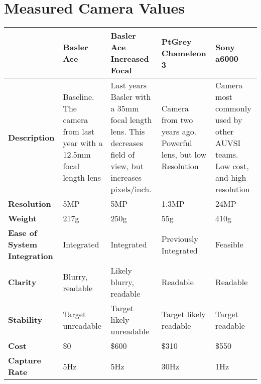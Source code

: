 \documentclass[]{auvsi_doc}
\begin{document}
\section{Measured Camera Values}
\begin{table}[H]
	\centering
	\begin{tabular}{|p{2.5cm}|p{2.9cm}|p{2.9cm}|p{2.9cm}|p{2.9cm}|}
	\hline
	\rowcolor[HTML]{C0C0C0}
& {\color[HTML]{000000} \textbf{Basler Ace}} & {\color[HTML]{000000} \textbf{Basler Ace Increased Focal}} & {\color[HTML]{000000} \textbf{PtGrey Chameleon 3}} & {\color[HTML]{000000} \textbf{Sony a6000}}\\ \hline
{\color[HTML]{000000} \textbf{Description}}	&	Baseline. The camera from last year with a 12.5mm focal length lens	&	Last years Basler with a 35mm focal length lens. This decreases field of view, but increases pixels/inch. &	Camera from two years ago. Powerful lens, but low Resolution	&	Camera most commonly used by other AUVSI teams. Low cost, and high resolution\\ \hline
{\color[HTML]{000000} \textbf{Resolution}}	&	5MP	&	5MP	&	1.3MP	&	24MP\\ \hline
{\color[HTML]{000000} \textbf{Weight}}	&	217g	&	250g	&	55g	&	410g\\ \hline
{\color[HTML]{000000} \textbf{Ease of System Integration}}	&	Integrated	&	Integrated	&	Previously Integrated	&	Feasible\\ \hline
{\color[HTML]{000000} \textbf{Clarity}}	&	Blurry, readable	&	Likely blurry, readable	&	Readable 	& Readable\\ \hline
{\color[HTML]{000000} \textbf{Stability}}	& Target unreadable	&	Target likely unreadable	&	Target likely readable	&	Target readable\\ \hline
{\color[HTML]{000000} \textbf{Cost}}	&	\$0 	&	\$600 	&	\$310	&	\$550\\ \hline
{\color[HTML]{000000} \textbf{Capture Rate}}	&	5Hz	&	5Hz	&	30Hz	&	1Hz\\ \hline
	\end{tabular}
\end{table}
\end{document}
